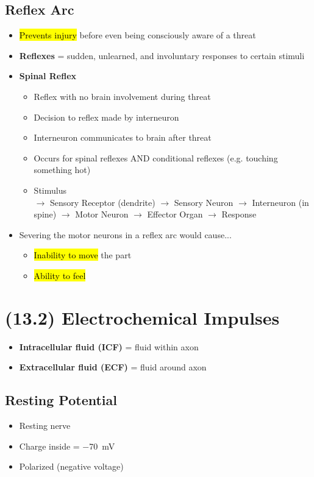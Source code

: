 \documentclass[a4paper,12pt]{article}
\begin{document}
\subsection{Reflex Arc}
\begin{itemize}
    \item{\hl{Prevents injury} before even being consciously aware of a threat}
    \item{\textbf{Reflexes} = sudden, unlearned, and involuntary responses to certain stimuli}
    \item{
            \textbf{Spinal Reflex}
            \begin{itemize}
                \item{Reflex with no brain involvement during threat}
                \item{Decision to reflex made by interneuron}
                \item{Interneuron communicates to brain after threat}
                \item{Occurs for spinal reflexes AND conditional reflexes (e.g. touching something hot)}
                \item{Stimulus \\ $\longrightarrow$ Sensory Receptor (dendrite) $\longrightarrow$ Sensory Neuron $\longrightarrow$ Interneuron (in spine) $\longrightarrow$ Motor Neuron $\longrightarrow$ Effector Organ $\longrightarrow$ Response}
            \end{itemize}
        }
    \item{
        Severing the motor neurons in a reflex arc would cause...
        \begin{itemize}
            \item{\hl{Inability to move} the part}
            \item{\hl{Ability to feel}}
        \end{itemize}
    }
\end{itemize}

\section{(13.2) Electrochemical Impulses}
\begin{itemize}
    \item{\textbf{Intracellular fluid (ICF)} = fluid within axon}
    \item{\textbf{Extracellular fluid (ECF)} = fluid around axon}
\end{itemize}

\subsection{Resting Potential}
\begin{itemize}
    \item{Resting nerve}
    \item{Charge inside = \SI{-70}{\mV}}
    \item{Polarized (negative voltage)}
\end{itemize}
\end{document}
